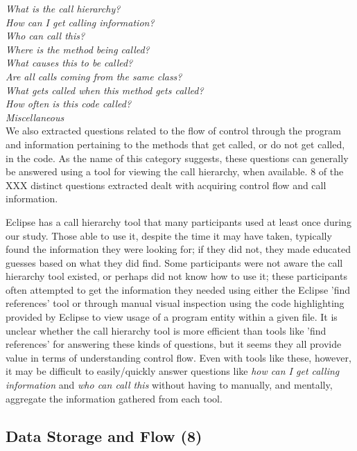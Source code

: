 \documentclass[conference]{IEEEtran}
\begin{document}
\noindent\emph{What is the call hierarchy?} \\
\emph{How can I get calling information?} \\
\emph{Who can call this?} \\
\emph{Where is the method being called?} \\
\emph{What causes this to be called?} \\
\emph{Are all calls coming from the same class?} \\
\emph{What gets called when this method gets called?} \\
\emph{How often is this code called?} \\
\emph{Miscellaneous} \\

We also extracted questions related to the flow of control through the program and information pertaining to the methods that get called, or do not get called, in the code. As the name of this category suggests, these questions can generally be answered using a tool for viewing the call hierarchy, when available. 8 of the XXX distinct questions extracted dealt with acquiring control flow and call information.

Eclipse has a call hierarchy tool that many participants used at least once during our study. Those able to use it, despite the time it may have taken, typically found the information they were looking for; if they did not, they made educated guesses based on what they did find. 
Some participants were not aware the call hierarchy tool existed, or perhaps did not know how to use it; these participants often attempted to get the information they needed using either the Eclipse 'find references' tool or through manual visual inspection using the code highlighting provided by Eclipse to view usage of a program entity within a given file.
It is unclear whether the call hierarchy tool is more efficient than tools like 'find references' for answering these kinds of questions, but it seems they all provide value in terms of understanding control flow. Even with tools like these, however, it may be difficult to easily/quickly answer questions like \emph{how can I get calling information} and \emph{who can call this} without having to manually, and mentally, aggregate the information gathered from each tool. 



\noindent\subsection{\textbf{Data Storage and Flow (8)}}
\end{document}
